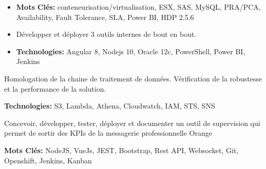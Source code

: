 \documentclass[10pt,a4paper,ragged2e]{altacv}
\begin{document}
\begin{paracol}{2}
\divider
{}
\begin{itemize}
\item \textbf{Mots Clés:} conteneurisation/virtualisation, ESX, SAS, MySQL, PRA/PCA, Availability, Fault Tolerance, SLA, Power BI, HDP 2.5.6
\medskip
\end{itemize}

\divider
{}
\begin{itemize}
\item Développer et déployer 3 outils internes de bout en bout.
\item \textbf{Technologies:} Angular 8, Nodejs 10, Oracle 12c, PowerShell, Power BI, Jenkins
\end{itemize}
\medskip


\newpage

\item Homologation de la chaine de traitement de données. Vérification de la robustesse et la performance de la solution.
\item \textbf{Technologies:} S3, Lambda, Athena, Cloudwatch, IAM, STS, SNS
\medskip

\item Concevoir, développer, tester, déployer et documenter un outil de supervision qui permet de sortir des KPIs de la messagerie professionnelle Orange
\item \textbf{Mots Clés:} NodeJS, VueJs, JEST, Bootstrap, Rest API, Websocket, Git, Openshift, Jenkins, Kanban
\medskip






\switchcolumn


\end{paracol}
\end{document}
